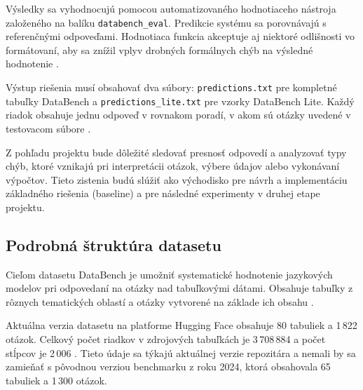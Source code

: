 Výsledky sa vyhodnocujú pomocou automatizovaného hodnotiaceho nástroja založeného na balíku \texttt{databench\_eval}. Predikcie systému sa porovnávajú s referenčnými odpoveďami. Hodnotiaca funkcia akceptuje aj niektoré odlišnosti vo formátovaní, aby sa znížil vplyv drobných formálnych chýb na výsledné hodnotenie \cite{hfdatabench}.

Výstup riešenia musí obsahovať dva súbory: \texttt{predictions.txt} pre kompletné tabuľky DataBench a \texttt{predictions\_lite.txt} pre vzorky DataBench Lite. Každý riadok obsahuje jednu odpoveď v rovnakom poradí, v akom sú otázky uvedené v testovacom súbore \cite{hfdatabench,databencheval}.

Z pohľadu projektu bude dôležité sledovať presnosť odpovedí a analyzovať typy chýb, ktoré vznikajú pri interpretácii otázok, výbere údajov alebo vykonávaní výpočtov. Tieto zistenia budú slúžiť ako východisko pre návrh a implementáciu základného riešenia (baseline) a pre následné experimenty v druhej etape projektu.

\subsection{Podrobná štruktúra datasetu}

Cieľom datasetu DataBench je umožniť systematické hodnotenie jazykových modelov pri odpovedaní na otázky nad tabuľkovými dátami. Obsahuje tabuľky z rôznych tematických oblastí a otázky vytvorené na základe ich obsahu \cite{semeval}.

Aktuálna verzia datasetu na platforme Hugging Face obsahuje 80 tabuliek a 1\,822 otázok. Celkový počet riadkov v zdrojových tabuľkách je 3\,708\,884 a počet stĺpcov je 2\,006 \cite{hfdatabench}. Tieto údaje sa týkajú aktuálnej verzie repozitára a nemali by sa zamieňať s pôvodnou verziou benchmarku z roku 2024, ktorá obsahovala 65 tabuliek a 1\,300 otázok.

